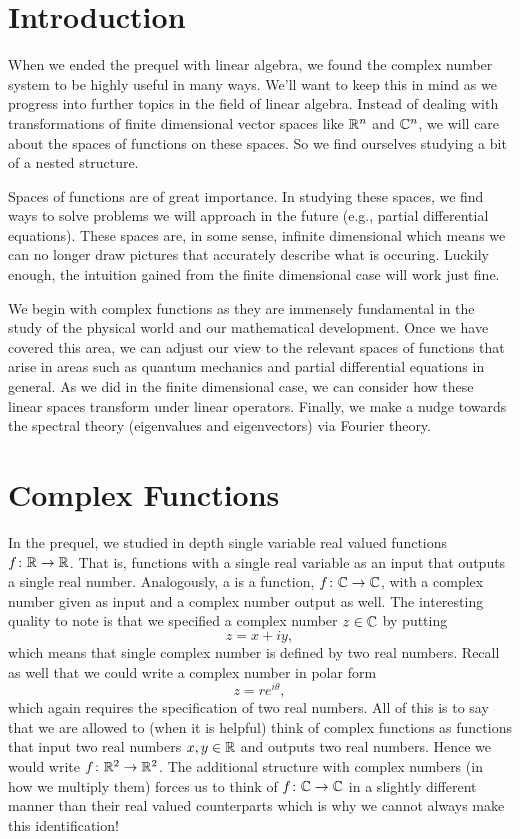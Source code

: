 \section{Introduction}

When we ended the prequel with linear algebra, we found the complex number system to be highly useful in many ways.  We'll want to keep this in mind as we progress into further topics in the field of linear algebra.  Instead of dealing with transformations of finite dimensional vector spaces like $\mathbb{R}^n$ and $\mathbb{C}^n$, we will care about the spaces of functions on these spaces. So we find ourselves studying a bit of a nested structure.

Spaces of functions are of great importance.  In studying these spaces, we find ways to solve problems we will approach in the future (e.g., partial differential equations).  These spaces are, in some sense, infinite dimensional which means we can no longer draw pictures that accurately describe what is occuring.  Luckily enough, the intuition gained from the finite dimensional case will work just fine.  

We begin with complex functions as they are immensely fundamental in the study of the physical world and our mathematical development.  Once we have covered this area, we can adjust our view to the relevant spaces of functions that arise in areas such as quantum mechanics and partial differential equations in general.  As we did in the finite dimensional case, we can consider how these linear spaces transform under linear operators.  Finally, we make a nudge towards the spectral theory (eigenvalues and eigenvectors) via Fourier theory.

\section{Complex Functions}

In the prequel, we studied in depth single variable real valued functions $f\colon \mathbb{R} \to \mathbb{R}$. That is, functions with a single real variable as an input that outputs a single real number. Analogously, a   is a function,  $f\colon \mathbb{C} \to \mathbb{C}$, with a complex number given as input and a complex number output as well.  The interesting quality to note is that we specified a complex number $z\in \mathbb{C}$ by putting
\[
z=x+iy,
\]
which means that single complex number is defined by two real numbers.  Recall as well that we could write a complex number in polar form
\[
z=re^{i\theta},
\]
which again requires the specification of two real numbers.  All of this is to say that we are allowed to (when it is helpful) think of complex functions as functions that input two real numbers $x,y\in \mathbb{R}$ and outputs two real numbers. Hence we would write $f\colon \mathbb{R}^2\to \mathbb{R}^2$.  The additional structure with complex numbers (in how we multiply them) forces us to think of $f\colon \mathbb{C} \to \mathbb{C}$ in a slightly different manner than their real valued counterparts which is why we cannot always make this identification!

